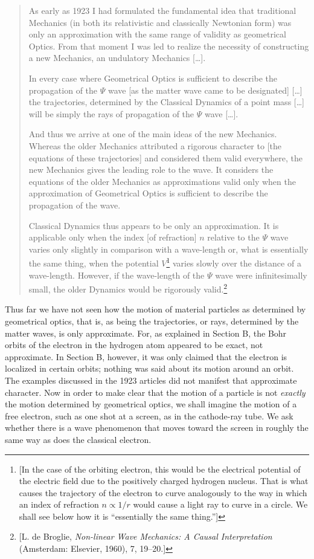 \begin{quotation}
As early as 1923 I had formulated the fundamental idea that traditional
Mechanics (in both its relativistic and classically Newtonian form) was
only an approximation with the same range of validity as geometrical
Optics. From that moment I was led to realize the necessity of
constructing a new Mechanics, an undulatory Mechanics [\ldots].

In every case where Geometrical Optics is sufficient to describe the
propagation of the $\Psi$ wave {[}as the matter wave came to be
designated{]} [\ldots] the trajectories, determined by the Classical
Dynamics of a point mass [\ldots] will be simply the rays of propagation of
the $\Psi$ wave [\ldots].

And thus we arrive at one of the main ideas of the new Mechanics.
Whereas the older Mechanics attributed a rigorous character to {[}the
equations of these trajectories{]} and considered them valid everywhere,
the new Mechanics gives the leading role to the wave. It considers the
equations of the older Mechanics as approximations valid only when the
approximation of Geometrical Optics is sufficient to describe the
propagation of the wave.

Classical Dynamics thus appears to be only an approximation. It is
applicable only when the index {[}of refraction{]} $n$ relative to
the $\Psi$ wave varies only slightly in comparison with a wave-length
or, what is essentially the same thing, when the potential
$V$\footnote{{[}In the case of the orbiting electron, this would be
  the electrical potential of the electric field due to the positively
  charged hydrogen nucleus. That is what causes the trajectory of the
  electron to curve analogously to the way in which an index of
  refraction $n \propto 1/r$ would cause a light ray to curve in a
  circle. We shall see below how it is ``essentially the same
  thing.''{]}} varies slowly over the distance of a wave-length.
However, if the wave-length of the $\Psi$ wave were infinitesimally
small, the older Dynamics would be rigorously valid.\footnote{{[}L. de
  Broglie, \emph{Non-linear Wave Mechanics: A Causal Interpretation}
  (Amsterdam: Elsevier, 1960), 7, 19--20.{]}}
\end{quotation}

Thus far we have not seen how the motion of material particles as
determined by geometrical optics, that is, as being the trajectories, or
rays, determined by the matter waves, is only approximate. For, as
explained in Section B, the Bohr orbits of the electron in the hydrogen
atom appeared to be exact, not approximate. In Section B, however, it
was only claimed that the electron is localized in certain orbits;
nothing was said about its motion around an orbit. The examples
discussed in the 1923 articles did not manifest that approximate
character. Now in order to make clear that the motion of a particle is
not \emph{exactly} the motion determined by geometrical optics, we shall
imagine the motion of a free electron, such as one shot at a screen, as
in the cathode-ray tube. We ask whether there is a wave phenomenon that
moves toward the screen in roughly the same way as does the classical
electron.

